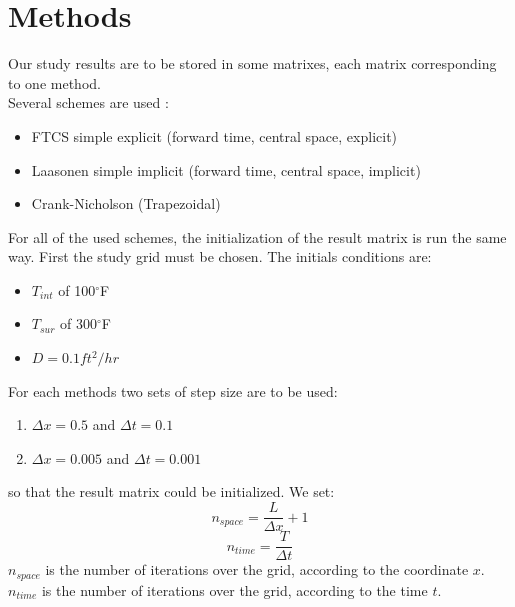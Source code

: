 \documentclass{article}
\begin{document}
        \section{Methods}
            Our study results are to be stored in some matrixes, each matrix corresponding to one method.\\
            Several schemes are used :
            \begin{itemize}
                \item{FTCS simple explicit (forward time, central space, explicit)}
                \item{Laasonen simple implicit (forward time, central space, implicit)}
                \item{Crank-Nicholson (Trapezoidal)}
            \end{itemize}
            For all of the used schemes, the initialization of the result matrix is run the same way.
            First the study grid must be chosen. The initials conditions are:
            \begin{itemize}
                \item{$T_{int}$ of 100$^{\circ}$F}
                \item{$T_{sur}$ of 300$^{\circ}$F}
                \item{$D = 0.1 ft^{2}/hr$}
            \end{itemize}
            For each methods two sets of step size are to be used:
            \begin{enumerate}
                \item{$\Delta x = 0.5$ and $\Delta t = 0.1$} 
                \item{$\Delta x = 0.005$ and $\Delta t = 0.001$} 
            \end{enumerate}
            so that the result matrix could be initialized.
            We set:
            \begin{equation}
                n_{space} = \frac{L}{\Delta x} + 1
            \end{equation}
            \begin{equation}
                n_{time} = \frac{T}{\Delta t}
            \end{equation}
            $n_{space}$ is the number of iterations over the grid, according to the coordinate $x$. \\
            $n_{time}$ is the number of iterations over the grid, according to the time $t$. \\
            
\end{document}

